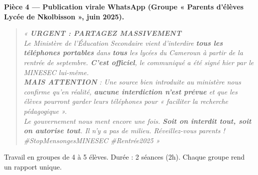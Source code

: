 \documentclass[11pt]{article}
\newcounter{popsec}
\newcounter{popsub}
\newcommand{\courssub}[1]{%
  \stepcounter{popsub}%
  \par\vspace{9pt}\noindent{\popxbold\fontsize{11.5}{13}\selectfont\color{popink}{\color{poporange}\thepopsec.\thepopsub}\hspace{6pt}#1}\par\nopagebreak\vspace{4pt}
}
\begin{document}
\vspace{0.5em}
\noindent\textbf{Pièce 4 — Publication virale WhatsApp (Groupe « Parents d'élèves Lycée de Nkolbisson », juin 2025).}
\begin{quote}
\emph{« \textbf{URGENT : PARTAGEZ MASSIVEMENT} \\
Le Ministère de l'Éducation Secondaire vient d'interdire \textbf{tous les téléphones portables} dans \textbf{tous} les lycées du Cameroun à partir de la rentrée de septembre. \textbf{C'est officiel}, le communiqué a été signé hier par le MINESEC lui-même. \\
\textbf{MAIS ATTENTION} : Une source bien introduite au ministère nous confirme qu'en réalité, \textbf{aucune interdiction n'est prévue} et que les élèves pourront garder leurs téléphones pour « faciliter la recherche pédagogique ». \\
Le gouvernement nous ment encore une fois. \textbf{Soit on interdit tout, soit on autorise tout}. Il n'y a pas de milieu. Réveillez-vous parents ! \#StopMensongesMINESEC \#Rentrée2025 »}
\end{quote}

\courssub{Consignes}
Travail en groupes de 4 à 5 élèves. Durée : 2 séances (2h). Chaque groupe rend un rapport unique.
\end{document}
